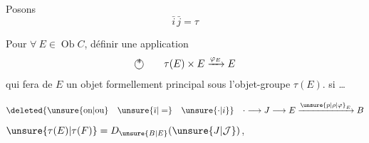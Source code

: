 Posons
\[
 \bar i\,\bar j=\tau
\]

Pour $\forall\ E\in\operatorname{Ob}C$,  définir une application
\[
 \text{\textcircled{*}}\qquad
 \tau(E)\times E\xrightarrow{\varphi_E}E
\]
qui fera de $E$ un objet formellement principal sous l'objet-groupe $\tau(E)$.
  si \ldots

\[
 \deleted{\text{\unsure{on|ou}}\quad\unsure{\bar{\imath}|=}\quad\unsure{\cdot|i}}\quad
 \cdot\longrightarrow J\longrightarrow E\xrightarrow{{\unsure{p|\rho|\varphi}}_E}B
\]
 $\unsure{\tau(E)|\tau(F)}=D_{\unsure{B|E}}(\unsure{J|\mathcal{J}})$,

